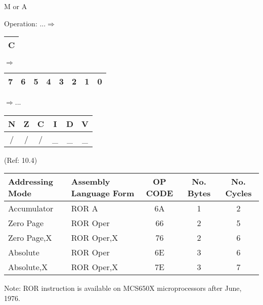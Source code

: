 \documentclass{article}
\begin{document}
  \begin{center}M or A\end{center}
  Operation:
  ...$\Rightarrow$
  \begin{tabular}{|c|}
  \hline
  C \\
  \hline
  \end{tabular}
  $\Rightarrow$
  \begin{tabular}{|c|c|c|c|c|c|c|c|}
  \hline
  7 & 6 & 5 & 4 & 3 & 2 & 1 & 0 \\
  \hline
  \end{tabular}
  $\Rightarrow$...

  \begin{table}[H]
  \centering
  \begin{tabular}{|c c c c c c|}
  \hline
  N&Z&C&I&D&V\\
  \hline
  / & / & / & \_ & \_ & \_\\
  \hline
  \end{tabular}
  \end{table}
                                 (Ref: 10.4)
  \begin{table}[H]
  \centering
  \begin{tabular}{|l|l|c|c|c|}
  \hline
    Addressing Mode& Assembly Language Form& OP CODE &No. Bytes&No. Cycles\\
  \hline
     Accumulator   &   ROR A               &    6A   &    1    &    2     \\
     Zero Page     &   ROR Oper            &    66   &    2    &    5     \\
     Zero Page,X   &   ROR Oper,X          &    76   &    2    &    6     \\
     Absolute      &   ROR Oper            &    6E   &    3    &    6     \\
     Absolute,X    &   ROR Oper,X          &    7E   &    3    &    7     \\
  \hline
  \end{tabular}
  \end{table}

    Note: ROR instruction is available on MCS650X microprocessors after
          June, 1976.
\end{document}
